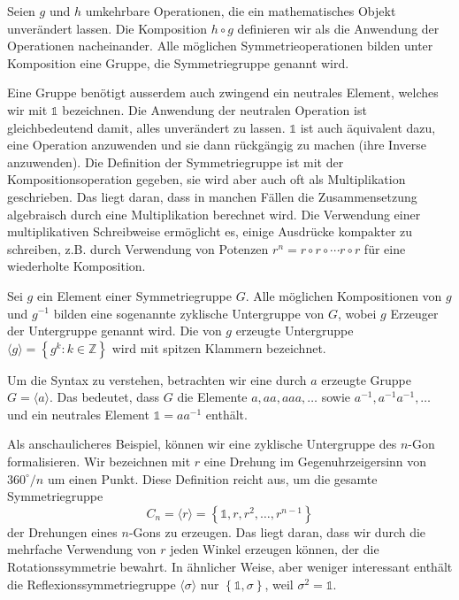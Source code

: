 \begin{definition}[Symmetriegruppe]
  Seien \(g\) und \(h\) umkehrbare Operationen, die ein mathematisches Objekt unverändert lassen.
  Die Komposition \(h\circ g\) definieren wir als die Anwendung der Operationen nacheinander.
  Alle möglichen Symmetrieoperationen bilden unter Komposition eine Gruppe, die Symmetriegruppe genannt wird.
\end{definition}

Eine Gruppe benötigt ausserdem auch zwingend ein neutrales Element, welches wir mit \(\mathds{1}\) bezeichnen.
Die Anwendung der neutralen Operation ist gleichbedeutend damit, alles unverändert zu lassen.
\(\mathds{1}\) ist auch äquivalent dazu, eine Operation anzuwenden und sie dann rückgängig zu machen (ihre Inverse anzuwenden).
 Die Definition der Symmetriegruppe ist mit der Kompositionsoperation gegeben, sie wird aber auch oft als Multiplikation geschrieben.
Das liegt daran, dass in manchen Fällen die Zusammensetzung algebraisch durch eine Multiplikation berechnet wird.
Die Verwendung einer multiplikativen Schreibweise ermöglicht es, einige Ausdrücke kompakter zu schreiben, z.B.
durch Verwendung von Potenzen \(r^n = r\circ r \circ \cdots r\circ r\) für eine wiederholte Komposition.

\begin{definition}
  Sei \(g\) ein Element einer Symmetriegruppe \(G\).
  Alle möglichen Kompositionen von \(g\) und \(g^{-1}\) bilden eine sogenannte zyklische Untergruppe von \(G\), wobei \(g\) Erzeuger der Untergruppe genannt wird.
  Die von \(g\) erzeugte Untergruppe \(\langle g \rangle = \left\{ g^k : k \in \mathbb{Z} \right\}\) wird mit spitzen Klammern bezeichnet.
\end{definition}
\begin{beispiel}
  Um die Syntax zu verstehen, betrachten wir eine durch \(a\) erzeugte Gruppe \(G = \langle a \rangle\).
  Das bedeutet, dass \(G\) die Elemente \(a, aa, aaa, \ldots\) sowie \(a^{-1}, a^{-1}a^{-1}, \ldots\) und ein neutrales Element \(\mathds{1} = aa^{-1}\) enthält.
\end{beispiel}
\begin{beispiel}
  Als anschaulicheres Beispiel, können wir eine zyklische Untergruppe des \(n\)-Gon formalisieren.
  Wir bezeichnen mit \(r\) eine Drehung im Gegenuhrzeigersinn von \(360^\circ/n\) um einen Punkt.
  Diese Definition reicht aus, um die gesamte Symmetriegruppe
  \[
    C_n = \langle r \rangle
      = \left\{\mathds{1}, r, r^2, \ldots, r^{n-1}\right\}
  \]
  der Drehungen eines \(n\)-Gons zu erzeugen.
  Das liegt daran, dass wir durch die mehrfache Verwendung von \(r\) jeden Winkel erzeugen k\"onnen, der die Rotationssymmetrie bewahrt.
  In ähnlicher Weise, aber weniger interessant  enthält die Reflexionssymmetriegruppe \(\langle\sigma\rangle\) nur \(\left\{\mathds{1}, \sigma\right\}\), weil \(\sigma^2 = \mathds{1}\).
\end{beispiel}

